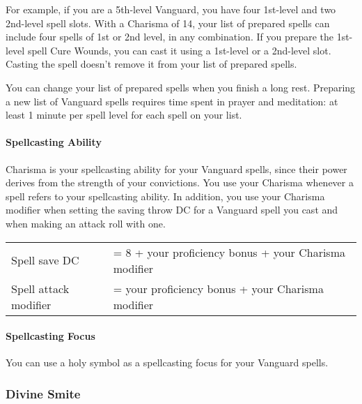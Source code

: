 For example, if you are a 5th-level Vanguard, you have four 1st-level
and two 2nd-level spell slots. With a Charisma of 14, your list of
prepared spells can include four spells of 1st or 2nd level, in any
combination. If you prepare the 1st-level spell Cure Wounds, you can
cast it using a 1st-level or a 2nd-level slot. Casting the spell doesn't
remove it from your list of prepared spells.

You can change your list of prepared spells when you finish a long rest.
Preparing a new list of Vanguard spells requires time spent in prayer
and meditation: at least 1 minute per spell level for each spell on your
list.

\paragraph{Spellcasting Ability}\label{_spellcasting_ability}

Charisma is your spellcasting ability for your Vanguard spells, since
their power derives from the strength of your convictions. You use your
Charisma whenever a spell refers to your spellcasting ability. In
addition, you use your Charisma modifier when setting the saving throw
DC for a Vanguard spell you cast and when making an attack roll with
one.

\begin{longtable}[]{@{}
  >{\raggedright\arraybackslash}p{}
  >{\raggedright\arraybackslash}p{}@{}}
\toprule\noalign{}
\endhead
\bottomrule\noalign{}
\endlastfoot
Spell save DC & = 8 + your proficiency bonus + your Charisma modifier \\
Spell attack modifier & = your proficiency bonus + your Charisma
modifier \\
\end{longtable}

\paragraph{Spellcasting Focus}\label{_spellcasting_focus}

You can use a holy symbol as a spellcasting focus for your Vanguard
spells.

\subsubsection{Divine Smite}\label{vanguard-feature-divine-smite}


